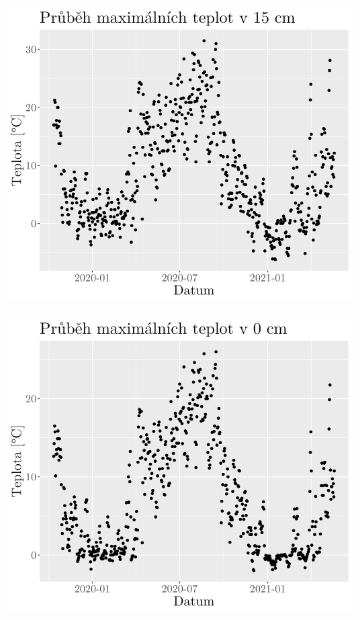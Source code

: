 \begin{figure}
	\centering
	\begin{subfigure}{0.45\textwidth}
  \includegraphics[width=\textwidth]{img/maxtempmax15cm.png}
		\caption{}
		\label{fig:maxtempmax15cm}
	\end{subfigure}
	\hfill
	\begin{subfigure}{0.45\textwidth}
  \includegraphics[width=\textwidth]{img/maxtempmax0cm.png}
		\caption{}
		\label{fig:maxtempmax0cm}
	\end{subfigure}

\end{figure}
